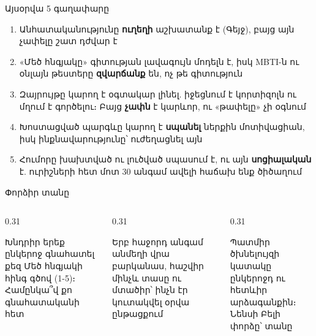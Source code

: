 \notopic

\begin{frame}{Այսօրվա 5 գաղափարը}
  \begin{enumerate}
    \item<1-> Անհատականությունը \textbf{ուղեղի} աշխատանք է (Գեյջ), բայց այն չափելը շատ դժվար է
    \item<2-> «Մեծ հնգյակը» գիտության լավագույն մոդելն է, իսկ MBTI-ն ու օնլայն թեստերը \textbf{զվարճանք} են, ոչ թե գիտություն
    \item<3-> Զայրույթը կարող է օգտակար լինել. իջեցնում է կորտիզոլն ու մղում է գործելու։ Բայց \textbf{չափն} է կարևոր, ու «թափելը» չի օգնում
    \item<4-> Խոստացված պարգևը կարող է \textbf{սպանել} ներքին մոտիվացիան, իսկ ինքնավարությունը՝ ուժեղացնել այն
    \item<5-> Հումորը խախտված ու լուծված սպասում է, ու այն \textbf{սոցիալական} է. ուրիշների հետ մոտ 30 անգամ ավելի հաճախ ենք ծիծաղում
  \end{enumerate}
\end{frame}

\begin{frame}{Փորձիր տանը}
  \begin{columns}[T]
    \begin{column}{0.31\textwidth}
      \begin{card}[colback=mint!30!cardwhite]
        \centering{}\par\smallskip
        \raggedright Խնդրիր երեք ընկերոջ գնահատել քեզ Մեծ հնգյակի հինգ գծով (1-5)։ Համընկա՞վ քո գնահատականի հետ
      \end{card}
    \end{column}
    \begin{column}{0.31\textwidth}
      \begin{card}[colback=brainpink!30!cardwhite]
        \centering{}\par\smallskip
        \raggedright Երբ հաջորդ անգամ անմեղի վրա բարկանաս, հաշվիր մինչև տասը ու մտածիր՝ ինչն էր կուտակվել օրվա ընթացքում
      \end{card}
    \end{column}
    \begin{column}{0.31\textwidth}
      \begin{card}[colback=lavender!35!cardwhite]
        \centering{}\par\smallskip
        \raggedright Պատմիր ծխնելույզի կատակը ընկերոջդ ու հետևիր արձագանքին։ Նենսի Բելի փորձը՝ տանը
      \end{card}
    \end{column}
  \end{columns}
\end{frame}

